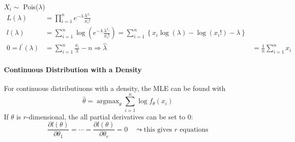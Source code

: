 \begin{examplesection}
    $X_i \sim$ Pois($\lambda$)
    \noindent\begin{align*}
        L(\lambda)            & =\prod_{i=1}^n e^{-\lambda}\frac{\lambda^{x_i}}{x_i!}                                                                                                          \\
        l(\lambda)            & =\sum_{i=1}^n\log\left(e^{-\lambda}\frac{\lambda^{x_i}}{x_i!}\right)=\sum_{i=1}^n\left\{x_i\log(\lambda)-\log(x_i!)-\lambda\right\}                            \\
        0=l^{\prime}(\lambda) & =\sum_{i=1}^n\frac{x_i}\lambda-n     \Rightarrow \hat{\lambda}                                                                      & =\frac1n\sum_{i=1}^n x_i
    \end{align*}
\end{examplesection}

\paragraph{Continuous Distribution with a Density}
For continuous distributiuons with a density, the MLE can be found with
\noindent\begin{equation*}
    \hat{\theta}=\operatorname{argmax}_\theta\sum_{i=1}^n\log f_\theta(x_i)
\end{equation*}
If $\theta$ is $r$-dimensional, the all partial derivatives can be set to 0:
\noindent\begin{equation*}
    \frac{\partial l(\theta)}{\partial\theta_1}=\cdots=\frac{\partial l(\theta)}{\partial\theta_r}=0\quad\leadsto\text{this gives }r\text{ equations}
\end{equation*}

